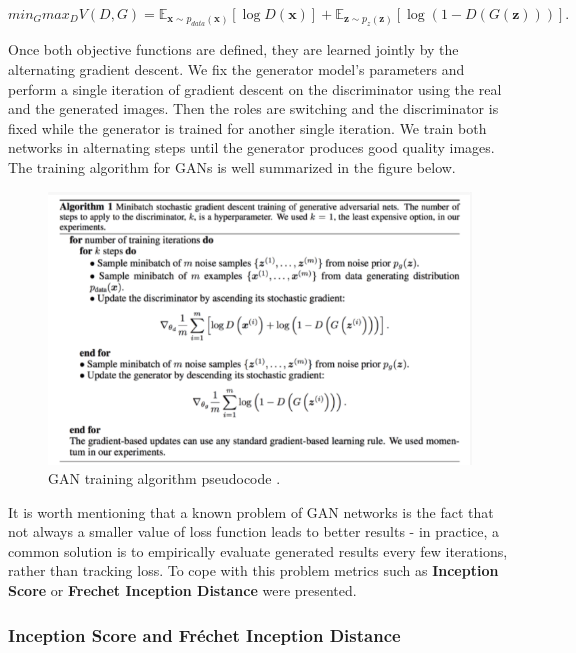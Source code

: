 \documentclass[12pt,a4paper,openany]{book}
\begin{document}
\begin{equation}
min_{G} max_{D} V(D, G) =  \mathbb{E}_{\textbf{x} \sim p_{data}(\textbf{x})} [\log D(\textbf{x})] + \mathbb{E}_{\textbf{z} \sim p_{z}(\textbf{z})} [\log(1-D(G(\textbf{z})))].
\end{equation}

\noindent Once both objective functions are defined, they are learned jointly by the alternating gradient descent. We fix the generator model’s parameters and perform a single iteration of gradient descent on the discriminator using the real and the generated images. Then the roles are switching and the discriminator is fixed while the generator is trained for another single iteration. We train both networks in alternating steps until the generator produces good quality images. The training algorithm for GANs is well summarized in the figure below.

 \begin{figure}[ht!]
     \centering
     \includegraphics[scale=0.7]{figs/gan_algo.png}
     \caption{GAN training algorithm pseudocode \cite{gan}.}
 \end{figure}
 
\noindent It is worth mentioning that a known problem of GAN networks is the fact that not always a smaller value of loss function leads to better results - in practice, a common solution is to empirically evaluate generated results every few iterations, rather than tracking loss. To cope with this problem metrics such as \textbf{Inception Score} or \textbf{Frechet Inception Distance} were presented. 

\subsubsection*{Inception Score and Fr\'echet Inception Distance}
\end{document}
